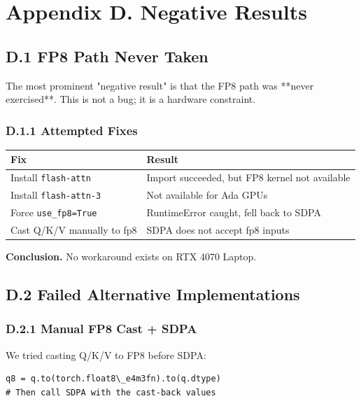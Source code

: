 
\section{Appendix D. Negative Results}

\subsection{D.1 FP8 Path Never Taken}

The most prominent "negative result" is that the FP8 path was **never 
exercised**. This is not a bug; it is a hardware constraint.

\subsubsection{D.1.1 Attempted Fixes}

\begin{table}[H]
\centering
\small
\begin{tabular}{ll}
\toprule
\textbf{Fix} & \textbf{Result} \\
\midrule
Install \texttt{flash-attn} & Import succeeded, but FP8 kernel not available \\
Install \texttt{flash-attn-3} & Not available for Ada GPUs \\
Force \texttt{use\_fp8=True} & RuntimeError caught, fell back to SDPA \\
Cast Q/K/V manually to fp8 & SDPA does not accept fp8 inputs \\
\bottomrule
\end{tabular}
\end{table}

\textbf{Conclusion.} No workaround exists on RTX 4070 Laptop.

\subsection{D.2 Failed Alternative Implementations}

\subsubsection{D.2.1 Manual FP8 Cast + SDPA}

We tried casting Q/K/V to FP8 before SDPA:

\begin{lstlisting}
q8 = q.to(torch.float8\_e4m3fn).to(q.dtype)
# Then call SDPA with the cast-back values
\end{lstlisting}

